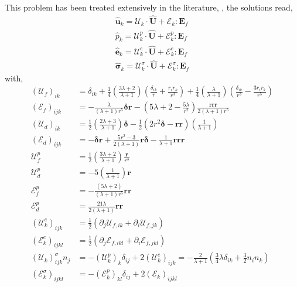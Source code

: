 This problem has been treated extensively in the literature, \citet{pozrikidis1992boundary,leal2007advanced},  the solutions read, 
\begin{align}
    \hat{\textbf{u}}_k = \mathcal{U}_k\cdot \hat{\textbf{U}}+ \mathcal{E}_k : \textbf{E}_f\\
    \hat{p}_k = \mathcal{U}_k^p\cdot \hat{\textbf{U}}+ \mathcal{E}_k^p : \textbf{E}_f\\
    \hat{\textbf{e}}_k = \mathcal{U}_k^e\cdot \hat{\textbf{U}}+ \mathcal{E}_k^e : \textbf{E}_f\\
    \hat{\bm\sigma}_k = \mathcal{U}_k^\sigma\cdot \hat{\textbf{U}}+ \mathcal{E}_k^\sigma : \textbf{E}_f
    \label{eq:solution_hat}
\end{align}
with, 
\begin{align*}
    (\mathcal{U}_{f})_{ik} &= 
    \delta_{ik}
    + \frac{1}{4}\left(\frac{3\lambda + 2}{\lambda +1}\right)
    \left(\frac{\delta_{ik}}{r} + \frac{r_ir_k}{r^3}\right) 
    + 
    \frac{1}{4}\left(\frac{\lambda}{\lambda +1}\right)
    \left(\frac{\delta_{ik}}{r^3} - \frac{3r_ir_k}{r^5}\right)  \\
    (\mathcal{E}_{f})_{ijk}
    &=
    -\frac{\lambda}{(\lambda + 1)r^5} \bm\delta\textbf{r}
    -\left(
        5\lambda +2
        - \frac{5\lambda}{r^2}
        \right) 
    \frac{\textbf{rrr}}{2(\lambda+1)r^5}\\
    (\mathcal{U}_{d})_{ik} &= 
    \frac{1}{2}\left(\frac{2\lambda +3}{\lambda +1}\right)\bm\delta
    -\frac{1}{2} (2r^2 \bm\delta - \textbf{rr})
    \left(\frac{1}{\lambda +1}\right)\\
    (\mathcal{E}_{d})_{ijk}
    &= -\bm\delta \textbf{r}
    + \frac{5r^2 -3}{2(\lambda +1)} \textbf{r}\bm\delta
    - \frac{1}{\lambda+1}\textbf{rrr}\\
    \mathcal{U}_f^p &= 
      \frac{1}{2}\left(\frac{3\lambda + 2}{\lambda +1}\right) \frac{\textbf{r}}{r^3}\\
     \mathcal{U}_d^p &= 
    - 5 \left(\frac{1}{\lambda +1}\right) \textbf{r}\\
    \mathcal{E}_f^p &= - \frac{(5\lambda+2)}{(\lambda+1)r^5}\textbf{rr}\\
    \mathcal{E}_d^p &= \frac{21\lambda}{2(\lambda+1)} \textbf{rr}\\
    (\mathcal{U}_k^e)_{ijk}
    &= 
    \frac{1}{2}(
    \partial_j 
    \mathcal{U}_{f,ik}
    + 
    \partial_i 
    \mathcal{U}_{f,jk}
    )\\
    (\mathcal{E}_k^e)_{ijkl}
    &= 
    \frac{1}{2}(
    \partial_j 
    \mathcal{E}_{f,ikl}
    + 
    \partial_i 
    \mathcal{E}_{f,jkl}
    )\\
    (\mathcal{U}_k)_{ijk}^\sigma  n_j 
    &= 
     - (\mathcal{U}_k^p)_{k}\delta_{ij}
     + 2(\mathcal{U}_k^e)_{ijk}
     = - \frac{2}{\lambda +1}\left(
         \frac{3}{4}\lambda\delta_{ik} 
         + \frac{3}{2} n_in_k
     \right)
     \\
     (\mathcal{E}_k^\sigma)_{ijkl}
     &=
     - (\mathcal{E}_k^p)_{kl}\delta_{ij}
     + 2(\mathcal{E}_k)_{ijkl}
\end{align*}
